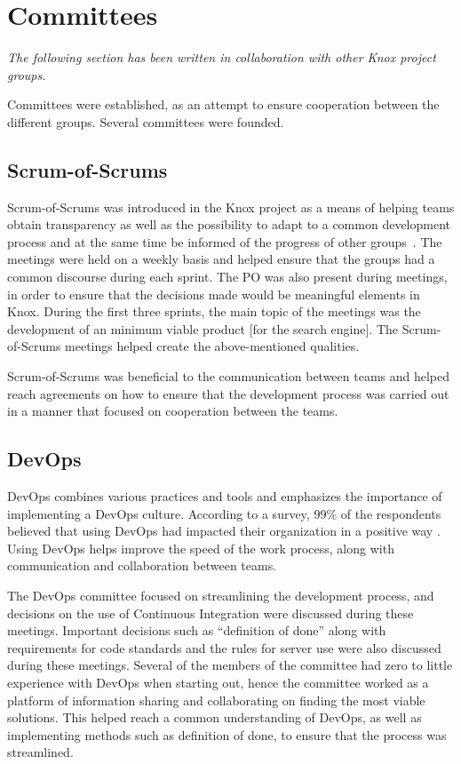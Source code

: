 \section{Committees}\label{SHARED-committees}
\textit{The following section has been written in collaboration with other Knox project groups.}

Committees were established, as an attempt to ensure cooperation between the different groups. Several committees were founded.

\subsection{Scrum-of-Scrums}
Scrum-of-Scrums was introduced in the Knox project as a means of helping teams obtain transparency as well as the possibility to adapt to a common development process and at the same time be informed of the progress of other groups\ \cite{agile}.
The meetings were held on a weekly basis and helped ensure that the groups had a common discourse during each sprint. 
The PO was also present during meetings, in order to ensure that the decisions made would be meaningful elements in Knox. 
During the first three sprints, the main topic of the meetings was the development of an minimum viable product [for the search engine].
The Scrum-of-Scrums meetings helped create the above-mentioned qualities.

Scrum-of-Scrums was beneficial to the communication between teams and helped reach agreements on how to ensure that the development process was carried out in a manner that focused on cooperation between the teams.

\subsection{DevOps}
DevOps combines various practices and tools and emphasizes the importance of implementing a DevOps culture. According to a survey, 99\% of the respondents believed that using DevOps had impacted their organization in a positive way \cite{Atlassian}. Using DevOps helps improve the speed of the work process, along with communication and collaboration between teams.

The DevOps committee focused on streamlining the development process, and decisions on the use of Continuous Integration were discussed during these meetings. 
Important decisions such as “definition of done” along with requirements for code standards and the rules for server use were also discussed during these meetings.
Several of the members of the committee had zero to little experience with DevOps when starting out, hence the committee worked as a platform of information sharing and collaborating on finding the most viable solutions. This helped reach a common understanding of DevOps, as well as implementing methods such as definition of done, to ensure that the process was streamlined.

